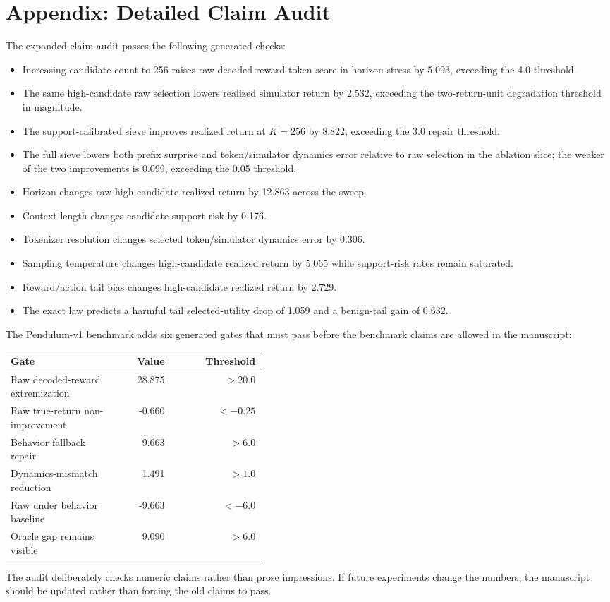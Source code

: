 \documentclass{article}
\begin{document}



\appendix

\section{Appendix: Detailed Claim Audit}

The expanded claim audit passes the following generated checks:
\begin{itemize}
\item Increasing candidate count to 256 raises raw decoded reward-token score in horizon stress by 5.093, exceeding the 4.0 threshold.
\item The same high-candidate raw selection lowers realized simulator return by 2.532, exceeding the two-return-unit degradation threshold in magnitude.
\item The support-calibrated sieve improves realized return at \(K=256\) by 8.822, exceeding the 3.0 repair threshold.
\item The full sieve lowers both prefix surprise and token/simulator dynamics error relative to raw selection in the ablation slice; the weaker of the two improvements is 0.099, exceeding the 0.05 threshold.
\item Horizon changes raw high-candidate realized return by 12.863 across the sweep.
\item Context length changes candidate support risk by 0.176.
\item Tokenizer resolution changes selected token/simulator dynamics error by 0.306.
\item Sampling temperature changes high-candidate realized return by 5.065 while support-risk rates remain saturated.
\item Reward/action tail bias changes high-candidate realized return by 2.729.
\item The exact law predicts a harmful tail selected-utility drop of 1.059 and a benign-tail gain of 0.632.
\end{itemize}
The Pendulum-v1 benchmark adds six generated gates that must pass before the benchmark claims are allowed in the manuscript:
\begin{center}
\small
\begin{tabular}{p{0.42\linewidth}rr}
\toprule
Gate & Value & Threshold \\
\midrule
Raw decoded-reward extremization & 28.875 & \(>20.0\) \\
Raw true-return non-improvement & -0.660 & \(<-0.25\) \\
Behavior fallback repair & 9.663 & \(>6.0\) \\
Dynamics-mismatch reduction & 1.491 & \(>1.0\) \\
Raw under behavior baseline & -9.663 & \(<-6.0\) \\
Oracle gap remains visible & 9.090 & \(>6.0\) \\
\bottomrule
\end{tabular}
\end{center}
The audit deliberately checks numeric claims rather than prose impressions. If future experiments change the numbers, the manuscript should be updated rather than forcing the old claims to pass.
\end{document}
